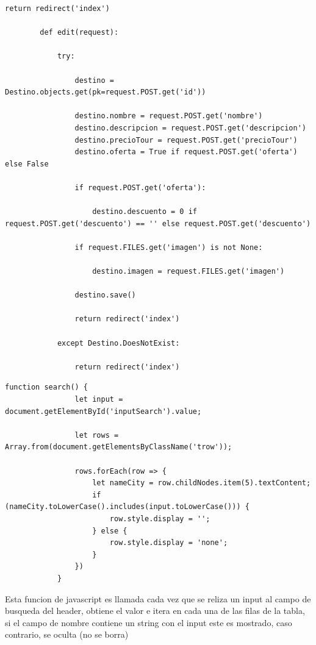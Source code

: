 \documentclass{article}
\begin{document}
\begin{lstlisting}[caption={Archivo views.py de app}, label={codigo-vistas-controladores}]
                return redirect('index')
        
        def edit(request):
        
            try:
        
                destino = Destino.objects.get(pk=request.POST.get('id'))
                
                destino.nombre = request.POST.get('nombre')
                destino.descripcion = request.POST.get('descripcion')
                destino.precioTour = request.POST.get('precioTour')
                destino.oferta = True if request.POST.get('oferta') else False
        
                if request.POST.get('oferta'):
                    
                    destino.descuento = 0 if request.POST.get('descuento') == '' else request.POST.get('descuento')
        
                if request.FILES.get('imagen') is not None:
        
                    destino.imagen = request.FILES.get('imagen')
                
                destino.save()
        
                return redirect('index')
                
            except Destino.DoesNotExist:
        
                return redirect('index')

        \end{lstlisting}

        \begin{lstlisting}[caption={script search}, label={codigo-scripts}]
            function search() {
                let input = document.getElementById('inputSearch').value;
                
                let rows = Array.from(document.getElementsByClassName('trow'));
            
                rows.forEach(row => {
                    let nameCity = row.childNodes.item(5).textContent;
                    if (nameCity.toLowerCase().includes(input.toLowerCase())) {
                        row.style.display = ''; 
                    } else {
                        row.style.display = 'none';
                    }
                })
            }
        \end{lstlisting}

        Esta funcion de javascript es llamada cada vez que se reliza un input al campo de busqueda del header, obtiene el valor e itera en cada una de las filas de la tabla, si el campo de nombre contiene un string con el input este es mostrado, caso contrario, se oculta (no se borra)
\end{document}
